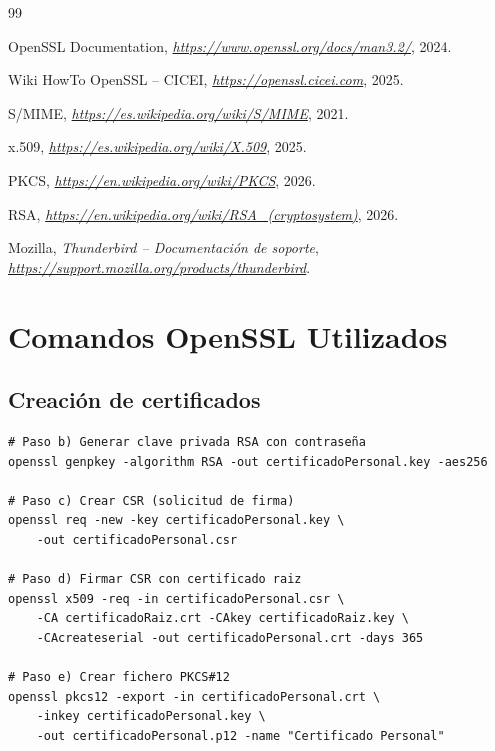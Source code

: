 \documentclass[12pt,a4paper]{report}
\begin{document}
\begin{thebibliography}{99}

 OpenSSL Documentation, \textit{\url{https://www.openssl.org/docs/man3.2/}}, 2024.

 Wiki HowTo OpenSSL -- CICEI, \textit{\url{https://openssl.cicei.com}}, 2025.

 S/MIME, \textit{\url{https://es.wikipedia.org/wiki/S/MIME}}, 2021.

 x.509, \textit{\url{https://es.wikipedia.org/wiki/X.509}}, 2025.

 PKCS, \textit{\url{https://en.wikipedia.org/wiki/PKCS}}, 2026.

 RSA, \textit{\url{https://en.wikipedia.org/wiki/RSA_(cryptosystem)}}, 2026.

 Mozilla, \textit{Thunderbird -- Documentación de soporte}, \textit{\url{https://support.mozilla.org/products/thunderbird}}.

\end{thebibliography}


\appendix

\chapter{Comandos OpenSSL Utilizados}

\section{Creación de certificados}

\begin{lstlisting}[caption=Comandos para creación del certificado personal]
# Paso b) Generar clave privada RSA con contraseña
openssl genpkey -algorithm RSA -out certificadoPersonal.key -aes256

# Paso c) Crear CSR (solicitud de firma)
openssl req -new -key certificadoPersonal.key \
    -out certificadoPersonal.csr

# Paso d) Firmar CSR con certificado raiz
openssl x509 -req -in certificadoPersonal.csr \
    -CA certificadoRaiz.crt -CAkey certificadoRaiz.key \
    -CAcreateserial -out certificadoPersonal.crt -days 365

# Paso e) Crear fichero PKCS#12
openssl pkcs12 -export -in certificadoPersonal.crt \
    -inkey certificadoPersonal.key \
    -out certificadoPersonal.p12 -name "Certificado Personal"
\end{lstlisting}
\end{document}
